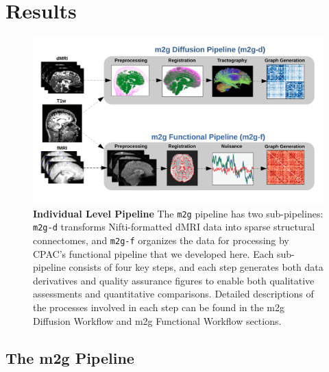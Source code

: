\section{Results}
\begin{figure}[t!]
	\centering
	\includegraphics[width=1\textwidth]{figures/m2g/m2g_pipeline.pdf}
    \caption[The \texttt{m2g} pipeline has two sub-pipelines: \texttt{m2g-d} transforms Nifti-formatted dMRI data into sparse structural connectomes, and \texttt{m2g-f} organizes the data for processing by CPAC's functional pipeline that we developed here.]
    {\textbf{Individual Level Pipeline}
  The \texttt{m2g} pipeline has two sub-pipelines: \texttt{m2g-d} transforms Nifti-formatted dMRI data into sparse structural connectomes, and \texttt{m2g-f} organizes the data for processing by CPAC's functional pipeline that we developed here. Each sub-pipeline consists of four key steps, and each step generates both data derivatives and quality assurance figures to enable both qualitative assessments and quantitative comparisons. Detailed descriptions of the processes involved in each step can be found in the m2g Diffusion Workflow and m2g Functional Workflow sections.
}
	\label{fig:ndmgpipeline}
\end{figure}


\subsection{The m2g Pipeline}

